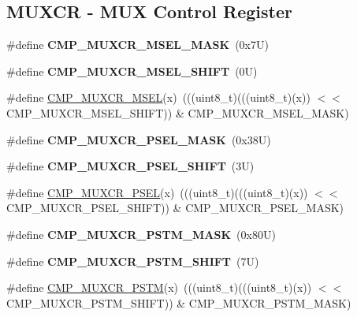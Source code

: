\subsection*{M\+U\+X\+CR -\/ M\+UX Control Register}
\begin{DoxyCompactItemize}
\item 
\mbox{\label{group___c_m_p___register___masks_ga6ff83366097d3be5ae93234b68684cf5}} 
\#define {\bfseries C\+M\+P\+\_\+\+M\+U\+X\+C\+R\+\_\+\+M\+S\+E\+L\+\_\+\+M\+A\+SK}~(0x7\+U)
\item 
\mbox{\label{group___c_m_p___register___masks_gad74d8206afe9b7ad009b0a7ac2bbf1cf}} 
\#define {\bfseries C\+M\+P\+\_\+\+M\+U\+X\+C\+R\+\_\+\+M\+S\+E\+L\+\_\+\+S\+H\+I\+FT}~(0\+U)
\item 
\#define \mbox{\hyperlink{group___c_m_p___register___masks_ga31028e9db6d77502d4561380ce1b12fe}{C\+M\+P\+\_\+\+M\+U\+X\+C\+R\+\_\+\+M\+S\+EL}}(x)~(((uint8\+\_\+t)(((uint8\+\_\+t)(x)) $<$$<$ C\+M\+P\+\_\+\+M\+U\+X\+C\+R\+\_\+\+M\+S\+E\+L\+\_\+\+S\+H\+I\+FT)) \& C\+M\+P\+\_\+\+M\+U\+X\+C\+R\+\_\+\+M\+S\+E\+L\+\_\+\+M\+A\+SK)
\item 
\mbox{\label{group___c_m_p___register___masks_gaba9739da107b2a2b908af338d14df160}} 
\#define {\bfseries C\+M\+P\+\_\+\+M\+U\+X\+C\+R\+\_\+\+P\+S\+E\+L\+\_\+\+M\+A\+SK}~(0x38\+U)
\item 
\mbox{\label{group___c_m_p___register___masks_gab686629f56ced4b88c699f0f610dece5}} 
\#define {\bfseries C\+M\+P\+\_\+\+M\+U\+X\+C\+R\+\_\+\+P\+S\+E\+L\+\_\+\+S\+H\+I\+FT}~(3\+U)
\item 
\#define \mbox{\hyperlink{group___c_m_p___register___masks_ga23ea598b890c708e1748b52475f92f50}{C\+M\+P\+\_\+\+M\+U\+X\+C\+R\+\_\+\+P\+S\+EL}}(x)~(((uint8\+\_\+t)(((uint8\+\_\+t)(x)) $<$$<$ C\+M\+P\+\_\+\+M\+U\+X\+C\+R\+\_\+\+P\+S\+E\+L\+\_\+\+S\+H\+I\+FT)) \& C\+M\+P\+\_\+\+M\+U\+X\+C\+R\+\_\+\+P\+S\+E\+L\+\_\+\+M\+A\+SK)
\item 
\mbox{\label{group___c_m_p___register___masks_ga5636686e652e5c89b119ff1954c0e98a}} 
\#define {\bfseries C\+M\+P\+\_\+\+M\+U\+X\+C\+R\+\_\+\+P\+S\+T\+M\+\_\+\+M\+A\+SK}~(0x80\+U)
\item 
\mbox{\label{group___c_m_p___register___masks_gafd77773e4a14b8f22b0b00c52a180d0c}} 
\#define {\bfseries C\+M\+P\+\_\+\+M\+U\+X\+C\+R\+\_\+\+P\+S\+T\+M\+\_\+\+S\+H\+I\+FT}~(7\+U)
\item 
\#define \mbox{\hyperlink{group___c_m_p___register___masks_ga062f6f254d40b3086bef0c64058f3db4}{C\+M\+P\+\_\+\+M\+U\+X\+C\+R\+\_\+\+P\+S\+TM}}(x)~(((uint8\+\_\+t)(((uint8\+\_\+t)(x)) $<$$<$ C\+M\+P\+\_\+\+M\+U\+X\+C\+R\+\_\+\+P\+S\+T\+M\+\_\+\+S\+H\+I\+FT)) \& C\+M\+P\+\_\+\+M\+U\+X\+C\+R\+\_\+\+P\+S\+T\+M\+\_\+\+M\+A\+SK)
\end{DoxyCompactItemize}


